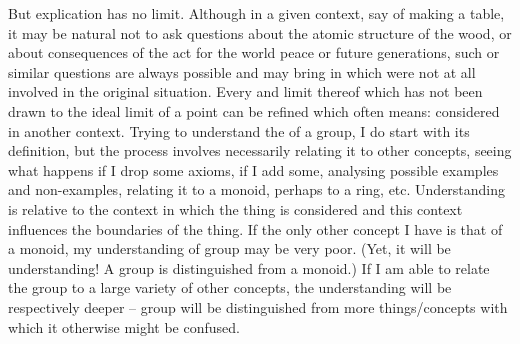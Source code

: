 \pa\label{pa:understand-context} But explication has no  limit.
Although in a given context, say of making a table, it may be natural not to ask
questions about the atomic structure of the wood, or about consequences of the
act for the world peace or future generations, such or similar questions are
always possible and may bring in  which were not at all
involved in the original situation. Every   and limit thereof
which has not been drawn to the ideal limit of a point can be refined which
often means: considered in another context.
%
Trying to understand the  of a group, I do start with its
definition, but the process involves necessarily relating it to other concepts,
seeing what happens if I drop some axioms, if I add some, analysing possible
examples and non-examples, relating it to a monoid, perhaps to a ring, etc.
 Understanding is relative to the context in which the
thing is considered and this context influences the boundaries of the thing. If
the only other concept I have is that of a monoid, my understanding of group may
be very poor. (Yet, it will be understanding! A group is distinguished from a
monoid.) If I am able to relate the group to a large variety of other concepts,
the understanding will be respectively deeper -- group will be distinguished
from more things/concepts with which it otherwise might be confused.


